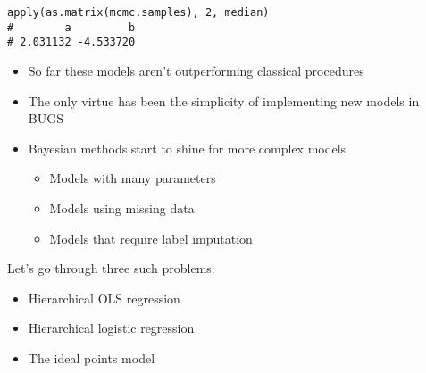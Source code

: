 \documentclass{beamer}
\begin{document}
\begin{frame}[fragile]
  \begin{verbatim}
apply(as.matrix(mcmc.samples), 2, median)
#        a         b 
# 2.031132 -4.533720 
  \end{verbatim}
\end{frame}



\begin{frame}
  \begin{itemize}
    \item{So far these models aren't outperforming classical procedures}
    \item{The only virtue has been the simplicity of implementing new models in BUGS}
  \end{itemize}
\end{frame}

\begin{frame}
  \begin{itemize}
    \item{Bayesian methods start to shine for more complex models}
    \begin{itemize}
      \item{Models with many parameters}
      \item{Models using missing data}
      \item{Models that require label imputation}
    \end{itemize}
  \end{itemize}
\end{frame}


\begin{frame}[fragile]
  Let's go through three such problems:
  \begin{itemize}
    \item{Hierarchical OLS regression}
    \item{Hierarchical logistic regression}
    \item{The ideal points model}
  \end{itemize}
\end{frame}
\end{document}

